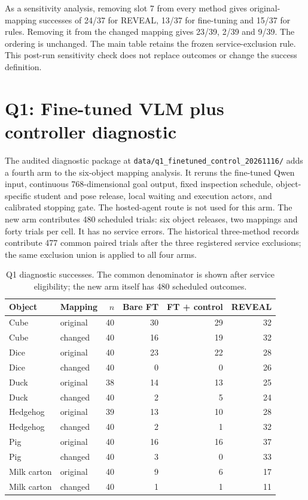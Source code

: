 As a sensitivity analysis, removing slot 7 from every method gives original-mapping successes of 24/37 for REVEAL, 13/37 for fine-tuning and 15/37 for rules. Removing it from the changed mapping gives 23/39, 2/39 and 9/39. The ordering is unchanged. The main table retains the frozen service-exclusion rule. This post-run sensitivity check does not replace outcomes or change the success definition.

\section{Q1: Fine-tuned VLM plus controller diagnostic}
The audited diagnostic package at \texttt{data/q1\_finetuned\_control\_20261116/} adds a fourth arm to the six-object mapping analysis. It reruns the fine-tuned Qwen input, continuous 768-dimensional goal output, fixed inspection schedule, object-specific student and pose release, local waiting and execution actors, and calibrated stopping gate. The hosted-agent route is not used for this arm. The new arm contributes 480 scheduled trials: six object releases, two mappings and forty trials per cell. It has no service errors. The historical three-method records contribute 477 common paired trials after the three registered service exclusions; the same exclusion union is applied to all four arms.

\begin{table}[t]
\centering\scriptsize
\setlength{\tabcolsep}{2pt}
\begin{tabular}{llrrrr}
\toprule
Object & Mapping & $n$ & Bare FT & FT + control & REVEAL\\
\midrule
Cube & original & 40 & 30 & 29 & 32\\
Cube & changed & 40 & 16 & 19 & 32\\
Dice & original & 40 & 23 & 22 & 28\\
Dice & changed & 40 & 0 & 0 & 26\\
Duck & original & 38 & 14 & 13 & 25\\
Duck & changed & 40 & 2 & 5 & 24\\
Hedgehog & original & 39 & 13 & 10 & 28\\
Hedgehog & changed & 40 & 2 & 1 & 32\\
Pig & original & 40 & 16 & 16 & 37\\
Pig & changed & 40 & 3 & 0 & 33\\
Milk carton & original & 40 & 9 & 6 & 17\\
Milk carton & changed & 40 & 1 & 1 & 11\\
\bottomrule
\end{tabular}
\caption{Q1 diagnostic successes. The common denominator is shown after service eligibility; the new arm itself has 480 scheduled outcomes.}
\label{tab:q1-control-diagnostic-supp}
\end{table}

